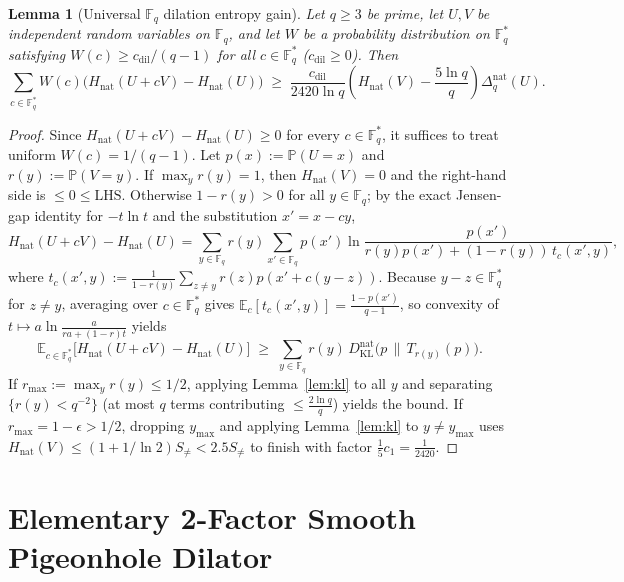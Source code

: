 \documentclass[11pt,a4paper]{amsart}
\newtheorem{lemma}[theorem]{Lemma}
\theoremstyle{definition}
\theoremstyle{remark}
\newcommand{\F}{\mathbb{F}}
\newcommand{\E}{\mathbb{E}}
\begin{document}
\begin{lemma}[Universal $\F_q$ dilation entropy gain]\label{lem:fqgain}
Let $q \ge 3$ be prime, let $U, V$ be independent random variables on $\F_q$, and let $W$ be a probability distribution on $\F_q^*$ satisfying $W(c) \ge c_{\mathrm{dil}}/(q-1)$ for all $c \in \F_q^*$ ($c_{\mathrm{dil}} \ge 0$). Then
\[
  \sum_{c \in \F_q^*} W(c)\bigl(H_{\mathrm{nat}}(U + cV) - H_{\mathrm{nat}}(U)\bigr)
  \;\ge\; \frac{c_{\mathrm{dil}}}{2420\ln q}\left(H_{\mathrm{nat}}(V) - \frac{5\ln q}{q}\right)\Delta_q^{\mathrm{nat}}(U).
\]
\end{lemma}

\begin{proof}
Since $H_{\mathrm{nat}}(U+cV) - H_{\mathrm{nat}}(U) \ge 0$ for every $c \in \F_q^*$, it suffices to treat uniform $W(c) = 1/(q-1)$. Let $p(x) := \mathbb{P}(U=x)$ and $r(y) := \mathbb{P}(V=y)$. If $\max_y r(y) = 1$, then $H_{\mathrm{nat}}(V) = 0$ and the right-hand side is $\le 0 \le \mathrm{LHS}$. Otherwise $1 - r(y) > 0$ for all $y \in \F_q$; by the exact Jensen-gap identity for $-t\ln t$ and the substitution $x' = x - cy$,
\[
  H_{\mathrm{nat}}(U+cV) - H_{\mathrm{nat}}(U)
  = \sum_{y \in \F_q} r(y) \sum_{x' \in \F_q} p(x') \ln\frac{p(x')}{r(y)p(x') + (1-r(y))\,t_c(x',y)},
\]
where $t_c(x',y) := \frac{1}{1-r(y)}\sum_{z \neq y} r(z) p(x' + c(y-z))$. Because $y - z \in \F_q^*$ for $z \neq y$, averaging over $c \in \F_q^*$ gives $\E_c[t_c(x',y)] = \frac{1-p(x')}{q-1}$, so convexity of $t \mapsto a\ln\frac{a}{ra + (1-r)t}$ yields
\[
  \E_{c \in \F_q^*}\bigl[H_{\mathrm{nat}}(U+cV) - H_{\mathrm{nat}}(U)\bigr]
  \;\ge\; \sum_{y \in \F_q} r(y)\,D_{\mathrm{KL}}^{\mathrm{nat}}\bigl(p \,\|\, T_{r(y)}(p)\bigr).
\]
If $r_{\max} := \max_y r(y) \le 1/2$, applying Lemma~\ref{lem:kl} to all $y$ and separating $\{r(y) < q^{-2}\}$ (at most $q$ terms contributing $\le \frac{2\ln q}{q}$) yields the bound. If $r_{\max} = 1-\epsilon > 1/2$, dropping $y_{\max}$ and applying Lemma~\ref{lem:kl} to $y \neq y_{\max}$ uses $H_{\mathrm{nat}}(V) \le (1 + 1/\ln 2) S_{\neq} < 2.5 S_{\neq}$ to finish with factor $\frac{1}{5} c_1 = \frac{1}{2420}$.
\end{proof}

\section{Elementary 2-Factor Smooth Pigeonhole Dilator}\label{sec:dilation}
\end{document}
